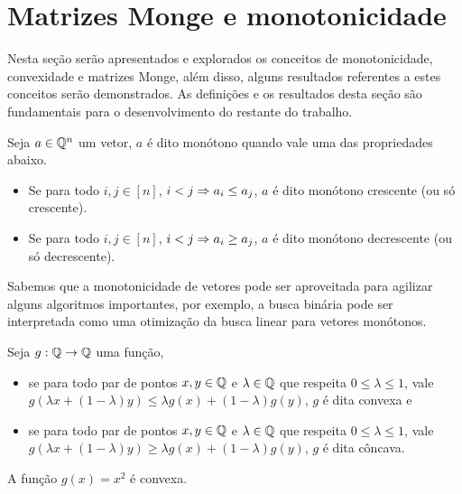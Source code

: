 \section{Matrizes Monge e monotonicidade}
\label{Monge}


Nesta seção serão apresentados e explorados os conceitos de monotonicidade, convexidade e matrizes Monge, além disso, alguns resultados referentes a estes conceitos serão demonstrados. As definições e os resultados desta seção são fundamentais para o desenvolvimento do restante do trabalho.  

\begin{defi}
Seja $a \in \mathbb{Q}^n$ um vetor, $a$ é dito monótono quando vale uma das propriedades abaixo.
    \begin{itemize}
        \item Se para todo $i,j \in [n]$, $i < j \Rightarrow a_i \leq a_j$, $a$ é dito monótono crescente (ou só crescente).
        \item Se para todo $i,j \in [n]$, $i < j \Rightarrow a_i \geq a_j$, $a$ é dito monótono decrescente (ou só decrescente).
    \end{itemize}
\end{defi}

Sabemos que a monotonicidade de vetores pode ser aproveitada para agilizar alguns algoritmos importantes, por exemplo, a busca binária pode ser interpretada como uma otimização da busca linear para vetores monótonos. 

\begin{defi}
Seja $g : \mathbb{Q} \to \mathbb{Q}$ uma função,
    \begin{itemize}
        \item se para todo par de pontos $x,y \in \mathbb{Q}$ e $\lambda \in \mathbb{Q}$ que respeita $0 \leq \lambda \leq 1$, vale~${g(\lambda x + (1 - \lambda)y) \leq \lambda g(x) + (1 - \lambda) g(y)}$, $g$ é dita convexa e 
        \item se para todo par de pontos $x,y \in \mathbb{Q}$ e $\lambda \in \mathbb{Q}$ que respeita $0 \leq \lambda \leq 1$, vale~${g(\lambda x + (1 - \lambda)y) \geq \lambda g(x) + (1 - \lambda) g(y)}$, $g$ é dita côncava.
    \end{itemize}
\end{defi}

\begin{prop} \label{Monge:sqConv}
A função $g(x) = x^2$ é convexa. 
\end{prop}

